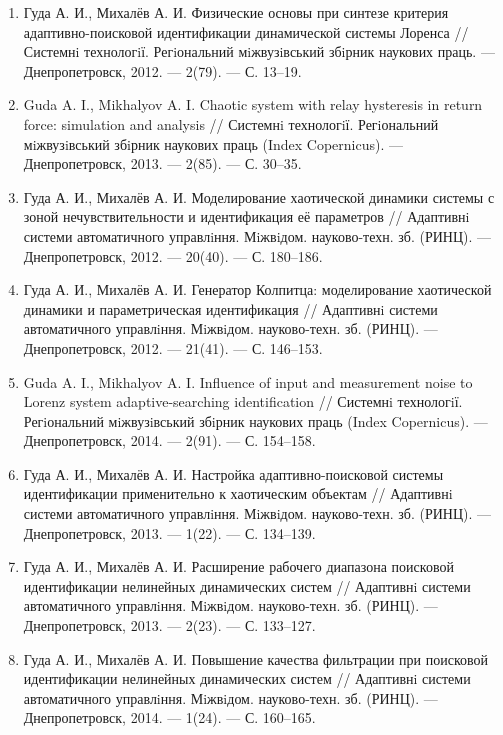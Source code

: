 \begin{enumerate}
\item
Гуда А. И., Михалёв А. И. Физические основы при синтезе критерия адаптивно-поисковой
идентификации динамической системы Лоренса // Системнi технологiї. Регiональний мiжвузiвський
збiрник наукових праць. --- Днепропетровск, 2012. --- 2(79). --- С. 13--19.

\item
Guda A. I., Mikhalyov A. I. Chaotic system with relay hysteresis in return force: simulation
and analysis // Системнi технологiї. Регiональний мiжвузiвський збiрник наукових
праць (Index Copernicus). --- Днепропетровск, 2013. --- 2(85). --- С. 30--35.

\item
Гуда А. И., Михалёв А. И. Моделирование хаотической динамики системы с зоной
нечувствительности и идентификация её параметров // Адаптивнi системи автоматичного
управлiння. Мiжвiдом. науково-техн. зб. (РИНЦ). --- Днепропетровск, 2012. ---
20(40). --- С. 180--186.

\item
Гуда А. И., Михалёв А. И. Генератор Колпитца: моделирование хаотической динамики
и параметрическая идентификация // Адаптивнi системи автоматичного управлiння.
Мiжвiдом. науково-техн. зб. (РИНЦ). --- Днепропетровск, 2012. --- 21(41). --- С. 146--153.

\item
Guda A. I., Mikhalyov A. I. Influence of input and measurement noise to Lorenz system
adaptive-searching identification // Системнi технологiї. Регiональний мiжвузiвський
збiрник наукових праць (Index Copernicus). --- Днепропетровск, 2014. --- 2(91). --- С. 154--158.

\item
Гуда А. И., Михалёв А. И. Настройка адаптивно-поисковой системы идентификации применительно
к хаотическим объектам // Адаптивнi системи автоматичного
управлiння. Мiжвiдом. науково-техн. зб. (РИНЦ). --- Днепропетровск, 2013. --- 1(22). ---
С. 134--139.

\item
Гуда А. И., Михалёв А. И. Расширение рабочего диапазона поисковой идентификации
нелинейных динамических систем // Адаптивнi системи автоматичного управлiння.
Мiжвiдом. науково-техн. зб. (РИНЦ). --- Днепропетровск, 2013. --- 2(23). --- С. 133--127.

\item
Гуда А. И., Михалёв А. И. Повышение качества фильтрации при поисковой идентификации
нелинейных динамических систем // Адаптивнi системи автоматичного
управлiння. Мiжвiдом. науково-техн. зб. (РИНЦ). --- Днепропетровск, 2014. --- 1(24). --- С. 160--165.


\end{enumerate}
